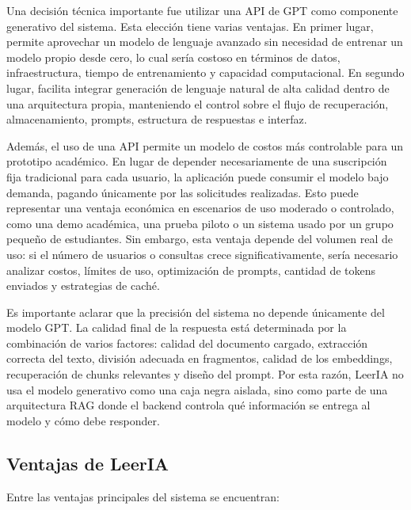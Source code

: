 \documentclass[12pt, letterpaper]{article}
\begin{document}
	Una decisión técnica importante fue utilizar una API de GPT como componente generativo del sistema. Esta elección tiene varias ventajas. En primer lugar, permite aprovechar un modelo de lenguaje avanzado sin necesidad de entrenar un modelo propio desde cero, lo cual sería costoso en términos de datos, infraestructura, tiempo de entrenamiento y capacidad computacional. En segundo lugar, facilita integrar generación de lenguaje natural de alta calidad dentro de una arquitectura propia, manteniendo el control sobre el flujo de recuperación, almacenamiento, prompts, estructura de respuestas e interfaz.
	
	Además, el uso de una API permite un modelo de costos más controlable para un prototipo académico. En lugar de depender necesariamente de una suscripción fija tradicional para cada usuario, la aplicación puede consumir el modelo bajo demanda, pagando únicamente por las solicitudes realizadas. Esto puede representar una ventaja económica en escenarios de uso moderado o controlado, como una demo académica, una prueba piloto o un sistema usado por un grupo pequeño de estudiantes. Sin embargo, esta ventaja depende del volumen real de uso: si el número de usuarios o consultas crece significativamente, sería necesario analizar costos, límites de uso, optimización de prompts, cantidad de tokens enviados y estrategias de caché.
	
	Es importante aclarar que la precisión del sistema no depende únicamente del modelo GPT. La calidad final de la respuesta está determinada por la combinación de varios factores: calidad del documento cargado, extracción correcta del texto, división adecuada en fragmentos, calidad de los embeddings, recuperación de chunks relevantes y diseño del prompt. Por esta razón, LeerIA no usa el modelo generativo como una caja negra aislada, sino como parte de una arquitectura RAG donde el backend controla qué información se entrega al modelo y cómo debe responder.
	
	\subsection{Ventajas de LeerIA}
	
	Entre las ventajas principales del sistema se encuentran:
	
\end{document}
